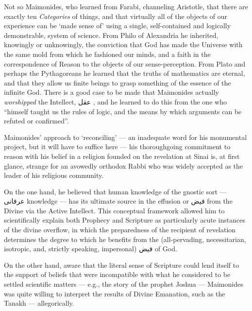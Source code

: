 \documentclass[12pt]{article}
\begin{document}
Not so Maimonides, who learned from Farabi, channeling Aristotle, that there are exactly ten \emph{Categories} of things, and that virtually all of the objects of our experience can be `made sense of' using a single, self-contained and logically demonstrable, system of science. From Philo of Alexandria he inherited, knowingly or unknowingly, the conviction that God has made the Universe with the same mold from which he fashioned our minds, and a faith in the correspondence of Reason to the objects of our sense-perception. From Plato and perhaps the Pythagoreans he learned that the truths of mathematics are eternal, and that they allow us finite beings to grasp something of the essence of the infinite God. There is a good case to be made that Maimonides actually \emph{worshipped} the Intellect, {\myfont عقل }, and he learned to do this from the one who ``himself taught us the rules of logic, and the means by which arguments can be refuted or confirmed''.

Maimonides' approach to `reconciling' --- an inadequate word for his monumental project, but it will have to suffice here --- his thoroughgoing commitment to reason with his belief in a religion founded on the revelation at Sinai is, at first glance, strange for an avowedly orthodox Rabbi who was widely accepted as the leader of his religious community. 

On the one hand, he believed that human knowledge of the gnostic sort --- {\myfont عرفانی} knowledge --- has its ultimate source in the effusion or {\myfont فیض} from the Divine via the Active Intellect. This conceptual framework allowed him to scientifically explain both Prophecy and Scripture as particularly acute instances of the divine overflow, in which the preparedness of the recipient of revelation determines the degree to which he benefits from the (all-pervading, necessitarian, isotropic, and, strictly speaking, impersonal) {\myfont فیض} of God. 

On the other hand, aware that the literal sense of Scripture could lend itself to the support of beliefs that were incompatible with what he considered to be settled scientific matters --- e.g., the story of the prophet Joshua --- Maimonides was quite willing to interpret the results of Divine Emanation, such as the Tanakh --- allegorically.
\end{document}
